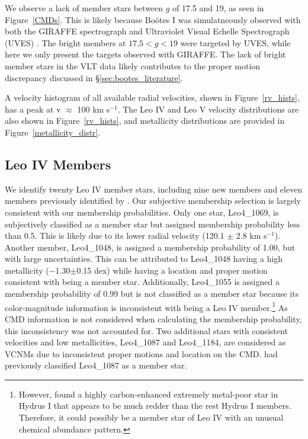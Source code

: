 \documentclass[twocolumn]{aastex63}
\newcommand{\revise}[1]{#1}
\begin{document}
We observe a lack of member stars between $g$ of 17.5 and 19, as seen in Figure~\ref{CMDs}. %
\revise{This is likely because Bo{\"o}tes I was simulatneously observed with both the GIRAFFE spectrograph and Ultraviolet Visual Echelle Spectrograph (UVES) \citep{kop2011}. The bright members at $17.5<g<19$ were targeted by UVES, while here we only present the targets observed with GIRAFFE.}
The lack of bright member stars in the VLT data likely contributes to the proper motion discrepancy discussed in \S\ref{sec:bootes_literature}. 

A velocity histogram of all available radial velocities, shown in Figure~\ref{rv_hists}, has a peak at v $\approx$ 100 km s$^{-1}$. The Leo IV and Leo V velocity distributions are also shown in Figure~\ref{rv_hists}, and metallicity distributions are provided in Figure~\ref{metallicity_distr}.


\subsection{Leo IV Members}
\label{sec:leoiv_members}

We identify twenty Leo IV member stars, including nine new members and eleven members previously identified by \citet{sim2007}. Our subjective membership selection is largely consistent with our membership probabilities. Only one star, Leo4\_1069, is subjectively classified as a member star but assigned membership probability less than 0.5. This is likely due to its lower radial velocity (120.1 $\pm$ 2.8 km s$^{-1}$). Another member, Leo4\_1048, is assigned a membership probability of 1.00, but with large uncertainties. This can be attributed to Leo4\_1048 having a high metallicity ($-$1.30$\pm$0.15 dex) while having a location and proper motion consistent with being a member star. Additionally, Leo4\_1055 is assigned a membership probability of 0.99 but is not classified as a member star because its color-magnitude information is inconsistent with being a Leo IV member.\footnote{However,  \citet{kop2018} found a highly carbon-enhanced extremely metal-poor star in Hydrus I that appears to be much redder than the rest Hydrus I members. Therefore, it could possibly be a member star of Leo IV with an unusual chemical abundance pattern.} As CMD information is not considered when calculating the membership probability, this inconsistency was not accounted for. Two additional stars with consistent velocities and low metallicities, Leo4\_1087 and Leo4\_1184, are considered as VCNMs due to inconsistent proper motions and location on the CMD. \citet{sim2007} had previously classified Leo4\_1087 as a member star. 
\end{document}
